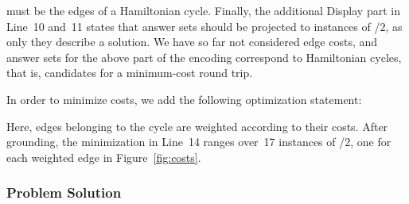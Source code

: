 must be the edges of a Hamiltonian cycle.%
Finally, the additional Display part in Line~10 and~11 states that answer
sets should be projected to instances of /$2$, as only they
describe a solution.
We have so far not considered edge costs,
and answer sets for the above 
part of the encoding correspond to Hamiltonian cycles,
that is, candidates for a minimum-cost round trip.

In order to minimize costs,
we add the following optimization statement:
%

%
Here, edges belonging to the cycle are weighted according to their costs.
After grounding, the minimization in Line~14 ranges over~17 instances
of /$2$, one for each weighted edge in Figure~\ref{fig:costs}.

\subsubsection{Problem Solution}\label{subsec:tsp:solution}


